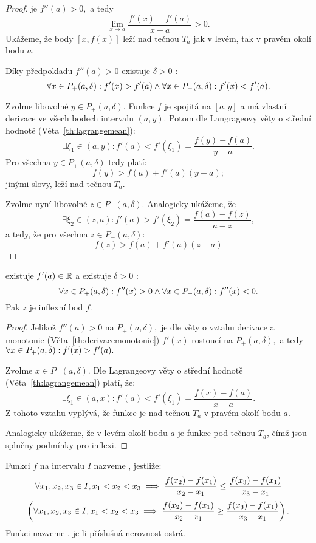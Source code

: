 \begin{proof}
    \Necht je \buno $f''(a) > 0,$ a tedy
    $$\lim_{x \to a} \frac{f'(x) - f'(a)}{x-a} > 0.$$
    Ukážeme, že body $[x,f(x)]$ leží nad tečnou $T_a$
    jak v levém, tak v pravém okolí bodu $a.$

    Díky předpokladu $f''(a) > 0$ existuje $\delta > 0$ \tz:
    $$\forall x \in P_+(a,\delta): f'(x) > f'(a) \land
    \forall x \in P_-(a, \delta): f'(x) < f'(a).$$

    Zvolme libovolné $y \in P_+(a,\delta).$ Funkce $f$ je spojitá na $[a,y]$ a
    má vlastní derivace ve všech bodech intervalu $(a,y).$ Potom dle
    Langrageovy věty o střední hodnotě (Věta~\ref{th:lagrangemean}):
    $$\exists \xi_1 \in (a,y): f'(a) < f'(\xi_1) = \frac{f(y) - f(a)}{y-a}.$$
    Pro všechna $y \in P_+(a,\delta)$ tedy platí:
    $$f(y) > f(a) + f'(a)(y-a);$$
    jinými slovy, leží nad tečnou $T_a.$

    Zvolme nyní libovolné $z \in P_-(a, \delta).$ Analogicky ukážeme, že
    $$\exists \xi_2 \in (z, a): f'(a) > f'(\xi_2) = \frac{f(a) - f(z)}{a-z},$$
    a tedy, že pro všechna $z \in P_-(a, \delta):$
    $$f(z)>f(a) + f'(a)(z-a)$$
\end{proof}

\begin{theorem}
    \label{th:inflexepostac}
    \Necht existuje $f'(a) \in \mathbb{R}$ a \necht existuje $\delta > 0$ \tz:
    $$\forall x \in P_+(a, \delta): f''(x) > 0 
    \land \forall x \in P_-(a, \delta): f''(x) < 0.$$
    Pak $z$ je inflexní bod $f.$
\end{theorem}

\begin{proof}
    Jelikož $f''(a) > 0$ na $P_+(a, \delta),$ je dle věty o vztahu derivace
    a monotonie (Věta~\ref{th:derivacemonotonie}) $f'(x)$ rostoucí na 
    $P_+(a, \delta),$ a tedy $\forall x \in P_+(a, \delta): f'(x) > f'(a).$

    Zvolme $x \in P_+(a,\delta).$ Dle Lagrangeovy věty o střední hodnotě 
    (Věta~\ref{th:lagrangemean}) platí, že:
    $$\exists \xi_1 \in (a,x): f'(a) < f'(\xi_1) = \frac{f(x) - f(a)}{x-a}.$$
    Z tohoto vztahu vyplývá, že funkce je nad tečnou $T_a$ v pravém okolí
    bodu $a.$
    
    Analogicky ukážeme, že v levém okolí bodu $a$ je funkce pod tečnou $T_a$,
    čímž jsou splněny podmínky pro inflexi.
\end{proof}

\begin{definition}
    Funkci $f$ na intervalu $I$ nazveme , jestliže:
    $$\forall x_1,x_2,x_3 \in I, x_1 < x_2 < x_3 \implies
    \frac{f(x_2) - f(x_1)}{x_2 - x_1} \leq \frac{f(x_3) - f(x_1)}{x_3 - x_1}$$
    $$\left(\forall x_1,x_2,x_3 \in I, x_1 < x_2 < x_3 \implies
    \frac{f(x_2) - f(x_1)}{x_2 - x_1} \geq \frac{f(x_3) - f(x_1)}{x_3 - x_1}\right).$$
    Funkci nazveme , je-li příslušná
    nerovnost ostrá.
\end{definition}


